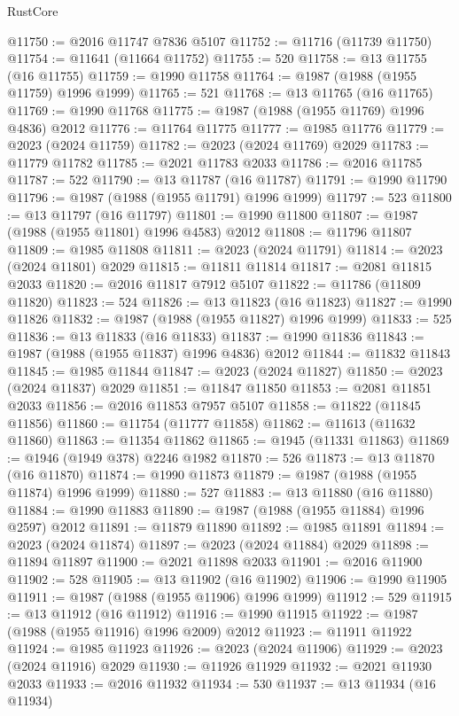\begin{lexlean}{RustCore}
\begin{coremodule}
@11750 := @2016 @11747 @7836 @5107
@11752 := @11716 (@11739 @11750)
@11754 := @11641 (@11664 @11752)
@11755 := 520
@11758 := @13 @11755 (@16 @11755)
@11759 := @1990 @11758
@11764 := @1987 (@1988 (@1955 @11759) @1996 @1999)
@11765 := 521
@11768 := @13 @11765 (@16 @11765)
@11769 := @1990 @11768
@11775 := @1987 (@1988 (@1955 @11769) @1996 @4836) @2012
@11776 := @11764 @11775
@11777 := @1985 @11776
@11779 := @2023 (@2024 @11759)
@11782 := @2023 (@2024 @11769) @2029
@11783 := @11779 @11782
@11785 := @2021 @11783 @2033
@11786 := @2016 @11785
@11787 := 522
@11790 := @13 @11787 (@16 @11787)
@11791 := @1990 @11790
@11796 := @1987 (@1988 (@1955 @11791) @1996 @1999)
@11797 := 523
@11800 := @13 @11797 (@16 @11797)
@11801 := @1990 @11800
@11807 := @1987 (@1988 (@1955 @11801) @1996 @4583) @2012
@11808 := @11796 @11807
@11809 := @1985 @11808
@11811 := @2023 (@2024 @11791)
@11814 := @2023 (@2024 @11801) @2029
@11815 := @11811 @11814
@11817 := @2081 @11815 @2033
@11820 := @2016 @11817 @7912 @5107
@11822 := @11786 (@11809 @11820)
@11823 := 524
@11826 := @13 @11823 (@16 @11823)
@11827 := @1990 @11826
@11832 := @1987 (@1988 (@1955 @11827) @1996 @1999)
@11833 := 525
@11836 := @13 @11833 (@16 @11833)
@11837 := @1990 @11836
@11843 := @1987 (@1988 (@1955 @11837) @1996 @4836) @2012
@11844 := @11832 @11843
@11845 := @1985 @11844
@11847 := @2023 (@2024 @11827)
@11850 := @2023 (@2024 @11837) @2029
@11851 := @11847 @11850
@11853 := @2081 @11851 @2033
@11856 := @2016 @11853 @7957 @5107
@11858 := @11822 (@11845 @11856)
@11860 := @11754 (@11777 @11858)
@11862 := @11613 (@11632 @11860)
@11863 := @11354 @11862
@11865 := @1945 (@11331 @11863)
@11869 := @1946 (@1949 @378) @2246 @1982
@11870 := 526
@11873 := @13 @11870 (@16 @11870)
@11874 := @1990 @11873
@11879 := @1987 (@1988 (@1955 @11874) @1996 @1999)
@11880 := 527
@11883 := @13 @11880 (@16 @11880)
@11884 := @1990 @11883
@11890 := @1987 (@1988 (@1955 @11884) @1996 @2597) @2012
@11891 := @11879 @11890
@11892 := @1985 @11891
@11894 := @2023 (@2024 @11874)
@11897 := @2023 (@2024 @11884) @2029
@11898 := @11894 @11897
@11900 := @2021 @11898 @2033
@11901 := @2016 @11900
@11902 := 528
@11905 := @13 @11902 (@16 @11902)
@11906 := @1990 @11905
@11911 := @1987 (@1988 (@1955 @11906) @1996 @1999)
@11912 := 529
@11915 := @13 @11912 (@16 @11912)
@11916 := @1990 @11915
@11922 := @1987 (@1988 (@1955 @11916) @1996 @2009) @2012
@11923 := @11911 @11922
@11924 := @1985 @11923
@11926 := @2023 (@2024 @11906)
@11929 := @2023 (@2024 @11916) @2029
@11930 := @11926 @11929
@11932 := @2021 @11930 @2033
@11933 := @2016 @11932
@11934 := 530
@11937 := @13 @11934 (@16 @11934)

\end{coremodule}
\end{lexlean}
